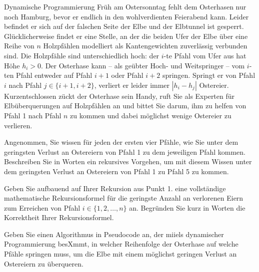 \documentclass{exercisesheet}
\begin{document}
\begin{eexercises}{Dynamische Programmierung}{
    Früh am Ostersonntag fehlt dem Osterhasen nur noch Hamburg, bevor er endlich in den wohlverdienten Feierabend kann. Leider befindet er sich auf der falschen Seite der Elbe und der Elbtunnel ist gesperrt. Glücklicherweise findet er eine Stelle, an der die beiden Ufer der Elbe über eine Reihe von $n$ Holzpfählen modelliert als Kantengewichten zuverlässig verbunden sind. Die Holzpfähle sind unterschiedlich hoch: der $i$-te Pfahl vom Ufer aus hat Höhe $h_i > 0$. Der Osterhase kann – als geübter Hoch- und Weitspringer – vom $i$-ten Pfahl entweder auf Pfahl $i+1$ oder Pfahl $i+2$ springen. Springt er von Pfahl $i$ nach Pfahl $j \in \{i + 1, i + 2\}$, verliert er leider immer $|h_i - h_j|$ Ostereier. Kurzentschlossen zückt der Osterhase sein Handy, ruft Sie als Experten für Elbüberquerungen auf Holzpfählen an und bittet Sie darum, ihm zu helfen von Pfahl 1 nach Pfahl $n$ zu kommen und dabei möglichst wenige Ostereier zu verlieren.
  }
  \item Angenommen, Sie wissen für jeden der ersten vier Pfähle, wie Sie unter dem geringsten Verlust an Ostereiern von Pfahl 1 zu dem jeweiligen Pfahl kommen. Beschreiben Sie in Worten ein rekursives Vorgehen, um mit diesem Wissen unter dem geringsten Verlust an Ostereiern von Pfahl 1 zu Pfahl 5 zu kommen.
  \item Geben Sie aufbauend auf Ihrer Rekursion aus Punkt 1. eine vollständige mathematische Rekursionsformel für die geringste Anzahl an verlorenen Eiern zum Erreichen von Pfahl $i \in \{1, 2, \ldots, n\}$ an. Begründen Sie kurz in Worten die Korrektheit Ihrer Rekursionsformel.
  \item Geben Sie einen Algorithmus in Pseudocode an, der miiels dynamischer Programmierung besXmmt, in welcher Reihenfolge der Osterhase auf welche Pfähle springen muss, um die Elbe mit einem möglichst geringen Verlust an Ostereiern zu überqueren.
\end{eexercises}
\end{document}
